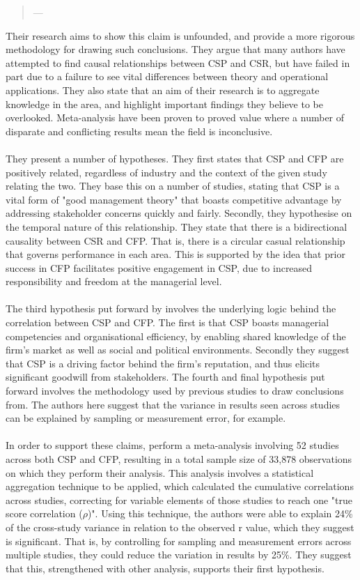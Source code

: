 {\begin{quote}
\hspace{2cm}--- \cite{orlitzky2003corporate}
\end{quote}
Their research aims to show this claim is unfounded, and provide a more rigorous methodology for drawing such conclusions. They argue that many authors have attempted to find causal relationships between CSP and CSR, but have failed in part due to a failure to see vital differences between theory and operational applications. They also state that an aim of their research is to aggregate knowledge in the area, and highlight important findings they believe to be overlooked. Meta-analysis have been proven to proved value where a number of disparate and conflicting results mean the field is inconclusive.\\\\
They present a number of hypotheses. They first states that CSP and CFP are positively related, regardless of industry and the context of the given study relating the two. They base this on a number of studies, stating that CSP is a vital form of "good management theory" that boasts competitive advantage by addressing stakeholder concerns quickly and fairly.  Secondly, they hypothesise on the temporal nature of this relationship. They state that there is a bidirectional causality between CSR and CFP. That is, there is a circular casual relationship that governs performance in each area. This is supported by the idea that prior success in CFP facilitates positive engagement in CSP, due to increased responsibility and freedom at the managerial level. \\\\
The third hypothesis put forward by \cite{orlitzky2003corporate} involves the underlying logic behind the correlation between CSP and CFP. The first is that CSP boasts managerial competencies and organisational efficiency, by enabling shared knowledge of the firm's market as well as social and political environments. Secondly they suggest that CSP is a driving factor behind the firm's reputation, and thus elicits significant goodwill from stakeholders. The fourth and final hypothesis put forward involves the methodology used by previous studies to draw conclusions from. The authors here suggest that the variance in results seen across studies can be explained by sampling or measurement error, for example. 
\\\\
In order to support these claims, \cite{orlitzky2003corporate} perform a meta-analysis involving 52 studies across both CSP and CFP, resulting in a total sample size of 33,878 observations on which they perform their analysis. This analysis involves a statistical aggregation technique to be applied, which calculated the cumulative correlations across studies, correcting for variable elements of those studies to reach one "true score correlation ($\rho$)". Using this technique, the authors were able to explain 24\% of the cross-study variance in relation to the observed r value, which they suggest is significant. That is, by controlling for sampling and measurement errors across multiple studies, they could reduce the variation in results by 25\%. They suggest that this, strengthened with other analysis, supports their first hypothesis. 


}
